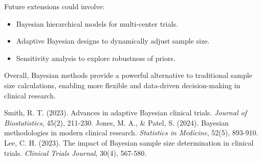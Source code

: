 \documentclass{article}
\begin{document}
	Future extensions could involve:
	\begin{itemize}
		\item Bayesian hierarchical models for multi-center trials.
		\item Adaptive Bayesian designs to dynamically adjust sample size.
		\item Sensitivity analysis to explore robustness of priors.
	\end{itemize}
	
	Overall, Bayesian methods provide a powerful alternative to traditional sample size calculations, enabling more flexible and data-driven decision-making in clinical research.
	
	\begin{thebibliography}{99}
		 Smith, R. T. (2023). Advances in adaptive Bayesian clinical trials. \textit{Journal of Biostatistics}, 45(2), 211-230.
		 Jones, M. A., \& Patel, S. (2024). Bayesian methodologies in modern clinical research. \textit{Statistics in Medicine}, 52(5), 893-910.
		 Lee, C. H. (2023). The impact of Bayesian sample size determination in clinical trials. \textit{Clinical Trials Journal}, 30(4), 567-580.
	\end{thebibliography}
	
\end{document}
